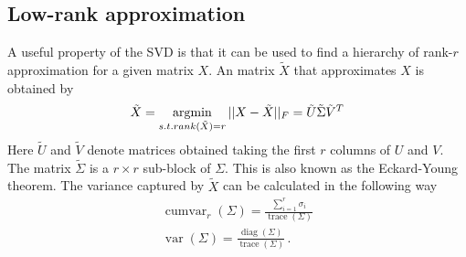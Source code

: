 \subsection{Low-rank approximation}
A useful property of the SVD is that it can be used to find a hierarchy of rank-\(r\) approximation for a given matrix \(X\).
An matrix \(\tilde{X}\) that approximates \(X\) is obtained by 
\begin{gather}
\tilde{X} = \operatorname*{argmin}\limits_{s.t. rank(\tilde{X}) = r} 
 ||X - \tilde{X}||_F = \tilde{U}\tilde{\Sigma}\tilde{V}^{T}
\end{gather}	
Here  \(\tilde{U}\) and \(\tilde{V}\) denote matrices obtained taking the first \(r\) columns of \(U\) and \(V\). The matrix \(\tilde{\Sigma}\) is a \(r \times r\) sub-block of \(\Sigma\).
This is also known as the Eckard-Young theorem.
The variance captured by \(\tilde{X}\) can be calculated in the following way \cite{brunton_kutz_2019b}
\begin{gather}
\operatorname{cumvar}_{r}(\Sigma) = \frac{\sum_{i = 1}^{r} \sigma_i}{\operatorname{trace}(\Sigma)} \label{cum-var-r} \\
\operatorname{var}(\Sigma) = \frac{\operatorname{diag}(\Sigma)}{\operatorname{trace}(\Sigma)} \,. \label{var-sig}
\end{gather}

